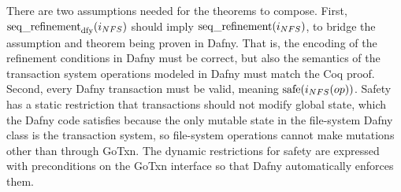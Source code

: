 There are two assumptions needed for the theorems to compose. First,
$\operatorname{seq\_refinement}_{\mathrm{dfy}}(i_{NFS})$ should imply $\operatorname{seq\_refinement}(i_{NFS})$,
to bridge the assumption and theorem being proven in Dafny. That is, the
encoding of the refinement conditions in Dafny must be correct, but also the
semantics of the transaction system operations modeled in Dafny must match the
Coq proof. Second, every Dafny transaction must be valid, meaning
$\mathrm{safe}(i_{NFS}(op))$. Safety has a static restriction that transactions
should not modify global state, which the Dafny code satisfies because the only
mutable state in the file-system Dafny class is the transaction system, so
file-system operations cannot make mutations other than through GoTxn. The
dynamic restrictions for safety are expressed with preconditions on the GoTxn
interface so that Dafny automatically enforces them.

